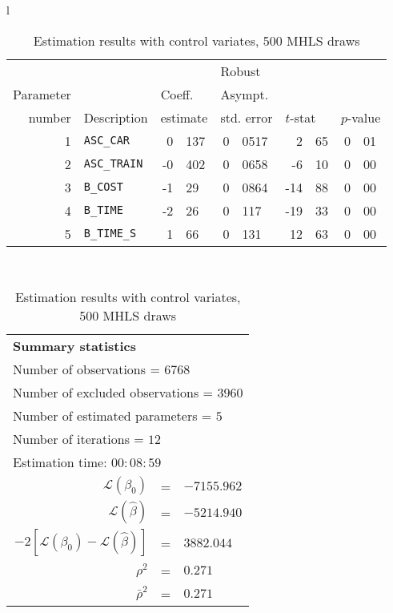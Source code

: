 \documentclass[12pt,a4paper]{article}
\begin{document}
\begin{table}[htb]
  \begin{tabular}{l}
\begin{tabular}{rlr@{.}lr@{.}lr@{.}lr@{.}l}
         &                       &   \multicolumn{2}{l}{}    & \multicolumn{2}{l}{Robust}  &     \multicolumn{4}{l}{}   \\
Parameter &                       &   \multicolumn{2}{l}{Coeff.}      & \multicolumn{2}{l}{Asympt.}  &     \multicolumn{4}{l}{}   \\
number &  Description                     &   \multicolumn{2}{l}{estimate}      & \multicolumn{2}{l}{std. error}  &   \multicolumn{2}{l}{$t$-stat}  &   \multicolumn{2}{l}{$p$-value}   \\

\hline

1 & \lstinline$ASC_CAR$ & 0&137 & 0&0517 & 2&65 & 0&01\\
2 & \lstinline$ASC_TRAIN$ & -0&402 & 0&0658 & -6&10 & 0&00\\
3 & \lstinline$B_COST$ & -1&29 & 0&0864 & -14&88 & 0&00\\
4 & \lstinline$B_TIME$ & -2&26 & 0&117 & -19&33 & 0&00\\
5 & \lstinline$B_TIME_S$ & 1&66 & 0&131 & 12&63 & 0&00\\
\hline
\end{tabular}
\\
\begin{tabular}{rcl}
\multicolumn{3}{l}{\bf Summary statistics}\\
\multicolumn{3}{l}{ Number of observations = $6768$} \\
\multicolumn{3}{l}{ Number of excluded observations = $3960$} \\
\multicolumn{3}{l}{ Number of estimated  parameters = $5$} \\
\multicolumn{3}{l}{ Number of iterations = $12$} \\
\multicolumn{3}{l}{ Estimation time: $00:08:59$} \\
 $\mathcal{L}(\beta_0)$ &=&  $-7155.962$ \\
 $\mathcal{L}(\hat{\beta})$ &=& $-5214.940 $  \\
 $-2[\mathcal{L}(\beta_0) -\mathcal{L}(\hat{\beta})]$ &=& $3882.044$ \\
    $\rho^2$ &=&   $0.271$ \\
    $\bar{\rho}^2$ &=&    $0.271$ \\
\end{tabular}
  \end{tabular}
\caption{\label{tab:estCV500}Estimation results with control variates, 500 MHLS draws}
\end{table}
\end{document}
